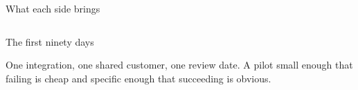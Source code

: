 
\begin{frame}{What each side brings}
  \begin{columns}[T]
  \end{columns}
\end{frame}

\begin{frame}{The first ninety days}
  \begin{glass}
  One integration, one shared customer, one review date. A pilot small enough that failing is
  cheap and specific enough that succeeding is obvious.
  \end{glass}
\end{frame}
